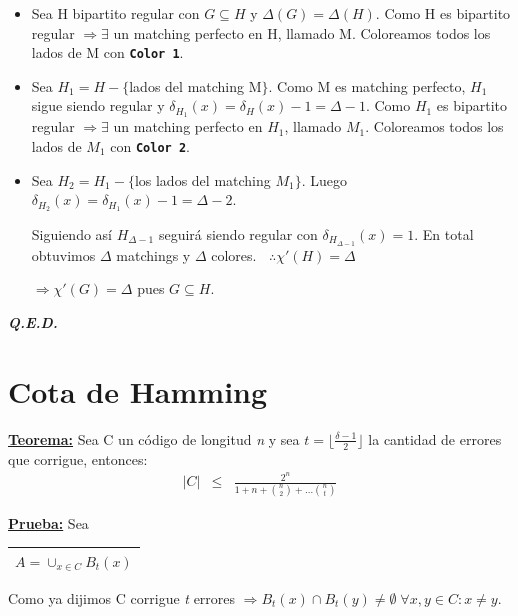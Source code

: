 \documentclass[12pt,a4paper]{report}
\newcounter{neq}
\newcommand{\QED}{\hfill \textit{\textbf{Q.E.D.}}}
\begin{document}
  			\pagebreak
  			\begin{itemize}
  				\item Sea H bipartito regular con $G \subseteq H$ y $\Delta(G) = \Delta(H)$. Como H es bipartito regular $\Rightarrow \exists$ un matching perfecto en H, llamado M. Coloreamos todos los lados de M con \textbf{\texttt{Color 1}}.
  				\item Sea $H_{1} = H - \lbrace$lados del matching M$\rbrace$. Como M es matching perfecto, $H_{1}$ sigue siendo regular y $\delta_{H_{1}}(x) = \delta_{H}(x) - 1 = \Delta - 1$. Como $H_{1}$ es bipartito regular $\Rightarrow \exists$ un matching perfecto en $H_{1}$, llamado $M_{1}$. Coloreamos todos los lados de $M_{1}$ con \textbf{\texttt{Color 2}}.
  				\item Sea $H_{2} = H_{1} - \lbrace$los lados del matching $M_{1} \rbrace$. Luego $\delta_{H_{2}}(x) = \delta_{H_{1}}(x) - 1 = \Delta - 2$.
  					\par Siguiendo así $H_{\Delta - 1}$ seguirá siendo regular con $ \delta_{H_{\Delta - 1}}(x) = 1$. En total obtuvimos $ \Delta $ matchings y $ \Delta $ colores. $\; \; \therefore \chi '(H) = \Delta$
  					\begin{center}
  						$\Rightarrow \chi ' (G) = \Delta$ pues $G \subseteq H$.
  					\end{center}
  			\end{itemize}

  		\QED

  	\pagebreak
  	\section{Cota de Hamming}
  		\textbf{\underline{Teorema:}} Sea C un código de longitud \textit{n} y sea $ t = \lfloor \frac{\delta - 1}{2} \rfloor$ la cantidad de errores que corrigue, entonces:
  			\begin{eqnarray}
  				\nonumber \lvert C \rvert &\leq & \frac{2^{n}}{1 + n + {n \choose 2} + \dotsc {n \choose t}}
  			\end{eqnarray}

  		\textbf{\underline{Prueba:}} Sea \begin{tabular}{|c|} \hline $ A = \cup_{x \in C} B_{t}(x) $ \\ \hline \end{tabular}

  			\vspace{3mm}
  				\par Como ya dijimos C corrigue \textit{t} errores $\Rightarrow B_{t}(x) \cap B_{t}(y) \neq \emptyset \; \forall x, y \in C : x \neq y$.
\end{document}

